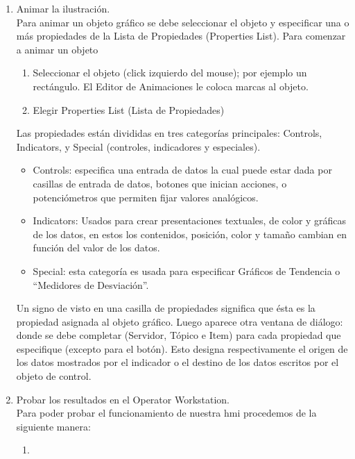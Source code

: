 \begin{enumerate}
 \item Animar la ilustración.\\
      Para animar un objeto gráfico se debe seleccionar el objeto y especificar una o
      más propiedades de la Lista de Propiedades (Properties List).
      Para comenzar a animar un objeto
      \begin{enumerate}
	\item Seleccionar el objeto (click izquierdo del mouse); por ejemplo un rectángulo. El
	Editor de Animaciones le coloca marcas al objeto.
	\item Elegir Properties List (Lista de Propiedades) 
      \end{enumerate}
      Las propiedades están divididas en tres
      categorías principales: Controls, Indicators, y Special 
      (controles, indicadores y especiales).
      \begin{itemize}
	\item  Controls: especifica una entrada de datos la cual puede estar dada por 
	casillas de entrada de datos, botones que inician acciones, o
	potenciómetros que permiten fijar valores analógicos.
	\item Indicators: Usados para crear presentaciones textuales, de color
	y gráficas de los datos, en estos los contenidos, posición, color y
	tamaño cambian en función del valor de los datos.
	\item Special: esta categoría es usada para especificar Gráficos de Tendencia o
	“Medidores de Desviación”.
      \end{itemize}
      Un signo de visto en una casilla de propiedades significa que ésta es la propiedad
      asignada al objeto gráfico. Luego aparece otra ventana de diálogo:
      donde se debe completar (Servidor, Tópico e Item) para cada
      propiedad que especifique (excepto para el botón). Esto designa
      respectivamente el origen de los datos mostrados por el indicador o 
      el destino de los datos escritos por el objeto de control.
      
 \item Probar los resultados en el Operator Workstation.\\
      Para poder probar el funcionamiento de nuestra \gls{hmi} procedemos de la siguiente manera:
      \begin{enumerate}
       \item 
      \end{enumerate}

\end{enumerate}












